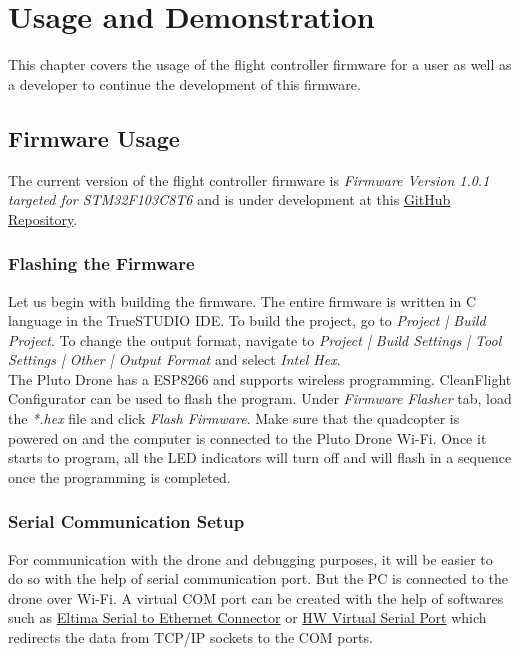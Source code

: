 \documentclass[a4paper,12pt,oneside]{book}
\begin{document}
\chapter[Usage and Demonstration]{Usage and Demonstration}
This chapter covers the usage of the flight controller firmware for a user as well as a developer to continue the development of this firmware.

\section{Firmware Usage}
The current version of the flight controller firmware is \textit{Firmware Version 1.0.1 targeted for STM32F103C8T6} and is under development at this \href{https://github.com/eYSIP-2017/eYSIP-2017_Control_and_Algorithms_development_for_Quadcopter/tree/master/firmware}{GitHub Repository}.\\

\subsection{Flashing the Firmware}
Let us begin with building the firmware. The entire firmware is written in C language in the TrueSTUDIO IDE. To build the project, go to \textit{Project | Build Project}. To change the output format, navigate to \textit{Project | Build Settings | Tool Settings | Other | Output Format} and select \textit{Intel Hex}.\\

The Pluto Drone has a ESP8266 and supports wireless programming. CleanFlight Configurator can be used to flash the program. Under \textit{Firmware Flasher} tab, load the \textit{*.hex} file and click \textit{Flash Firmware}. Make sure that the quadcopter is powered on and the computer is connected to the Pluto Drone Wi-Fi. Once it starts to program, all the LED indicators will turn off and will flash in a sequence once the programming is completed.\\

\subsection{Serial Communication Setup}
\label{ssec:serial}
For communication with the drone and debugging purposes, it will be easier to do so with the help of serial communication port. But the PC is connected to the drone over Wi-Fi. A virtual COM port can be created with the help of softwares such as \href{https://www.eltima.com/products/serial-over-ethernet/}{Eltima Serial to Ethernet Connector} or \href{http://www.hw-group.com/products/hw_vsp/index_en.html}{HW Virtual Serial Port} which redirects the data from TCP/IP sockets to the COM ports.\\
\end{document}
